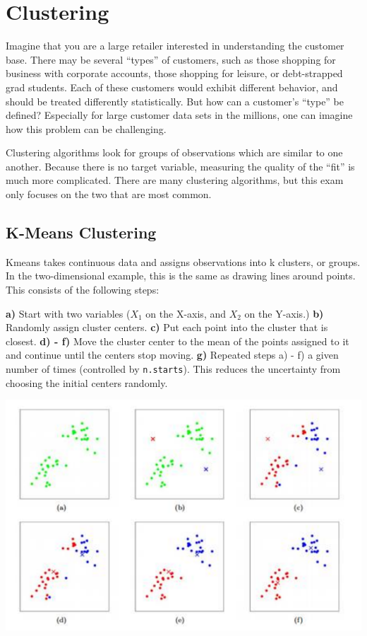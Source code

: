 \documentclass[
  openany]{book}
\begin{document}
\hypertarget{clustering}{%
\section{Clustering}\label{clustering}}

Imagine that you are a large retailer interested in understanding the customer base. There may be several ``types'' of customers, such as those shopping for business with corporate accounts, those shopping for leisure, or debt-strapped grad students. Each of these customers would exhibit different behavior, and should be treated differently statistically. But how can a customer's ``type'' be defined? Especially for large customer data sets in the millions, one can imagine how this problem can be challenging.

Clustering algorithms look for groups of observations which are similar to one another. Because there is no target variable, measuring the quality of the ``fit'' is much more complicated. There are many clustering algorithms, but this exam only focuses on the two that are most common.

\hypertarget{k-means-clustering}{%
\subsection{K-Means Clustering}\label{k-means-clustering}}

Kmeans takes continuous data and assigns observations into k clusters, or groups. In the two-dimensional example, this is the same as drawing lines around points. This consists of the following steps:

\textbf{a)} Start with two variables (\(X_1\) on the X-axis, and \(X_2\) on the Y-axis.)
\textbf{b)} Randomly assign cluster centers.
\textbf{c)} Put each point into the cluster that is closest.
\textbf{d) - f)} Move the cluster center to the mean of the points assigned to it and continue until the centers stop moving.
\textbf{g)} Repeated steps a) - f) a given number of times (controlled by \texttt{n.starts}). This reduces the uncertainty from choosing the initial centers randomly.

\includegraphics[width=10\linewidth]{images/kmeans}
\end{document}
